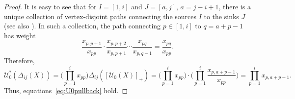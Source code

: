\documentclass[11pt]{article}
\theoremstyle{definition}\newtheorem{definition}[theorem]{Definition}
\theoremstyle{definition}\newtheorem{remark}[theorem]{Remark}
\theoremstyle{remark}
\numberwithin{equation}{section}
\begin{document}
\begin{proof}
    It is easy to see that for $I = [1,i]$ and $J = [a,j]$, $a = j-i+1$, there is a unique collection of vertex-disjoint paths connecting the sources $I$ to the sinks $J$ (see also \cite[Proof of Lemma 6]{fz-total}). In such a collection, the path connecting $p \in [1,i]$ to $q=a+p-1$ has weight 
    \begin{equation*}
        \frac{x_{p,p+1}}{x_{pp}} \cdot \frac{x_{p,p+2}}{x_{p,p+1}}\cdots \frac{x_{pq}}{x_{p,q-1}} = \frac{x_{pq}}{x_{pp}}.
    \end{equation*}
    Therefore, 
    \begin{equation*}
        \mathcal{U}_0^*(\Delta_{ij}(X)) = \Big( \prod_{p=1}^i x_{pp}\Big) \Delta_{ij}([\mathcal{U}_0(X)]_+) = \Big( \prod_{p=1}^i x_{pp}\Big)\cdot \Big( \prod_{p=1}^i \frac{x_{p,a+p-1}}{x_{pp}} \Big) = \prod_{p=1}^i x_{p,a+p-1}.
    \end{equation*}
    Thus, equations~\eqref{eq:U0pullback} hold.
\end{proof}
\end{document}

